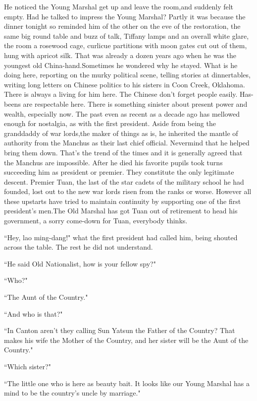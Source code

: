 \par He noticed the Young Marshal get up and leave the room,and suddenly felt empty. Had he talked to impress the Young Marshal? Partly it was because the dinner tonight so reminded him of the other on the eve of the restoration, the same big round table and buzz of talk, Tiffany lamps and an overall white glare, the room a rosewood cage, curlicue partitions with moon gates cut out of them, hung with apricot silk. That was already a dozen years ago when he was the youngest old China-hand.Sometimes he wondered why he stayed. What is he doing here, reporting on the murky political scene, telling stories at dinnertables, writing long letters on Chinese politics to his sisters in Coon Creek, Oklahoma. There is always a living for him here. The Chinese don't forget people easily. Has-beens are respectable here. There is something sinister about present power and wealth, especially now. The past even as recent as a decade ago has mellowed enough for nostalgia, as with the first president. Aside from being the granddaddy of war lords,the maker of things as is, he inherited the mantle of authority from the Manchus as their last chief official. Nevermind that he helped bring them down. That's the trend of the times and it is generally agreed that the Manchus are impossible. After he died his favorite pupils took turns succeeding him as president or premier. They constitute the only legitimate descent. Premier Tuan, the last of the star cadets of the military school he had founded, lost out to the new war lords risen from the ranks or worse. However all these upstarts have tried to maintain continuity by supporting one of the first president's men.The Old Marshal has got Tuan out of retirement to head his government, a sorry come-down for Tuan, everybody thinks.
\par ``Hey, lao ming-dang!" what the first president had called him, being shouted across the table. The rest he did not understand.
\par ``He said Old Nationalist, how is your fellow spy?"
\par ``Who?"
\par ``The Aunt of the Country."
\par ``And who is that?"
\par ``In Canton aren't they calling Sun Yatsun the Father of the Country? That makes his wife the Mother of the Country, and her sister will be the Aunt of the Country."
\par ``Which sister?"
\par ``The little one who is here as beauty bait. It looks like our Young Marshal has a mind to be the country's uncle by marriage."
